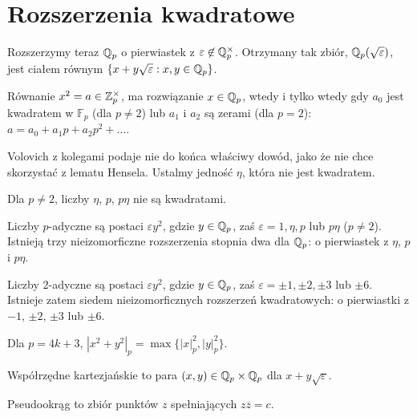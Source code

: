 \section{Rozszerzenia kwadratowe}
Rozszerzymy teraz $\mathbb Q_p$ o pierwiastek z $\varepsilon \not \in \mathbb Q_p^\times$. Otrzymany tak zbiór, $\mathbb Q_p(\sqrt{\varepsilon})$, jest ciałem równym $\{x + y \sqrt{\varepsilon} : x, y \in \mathbb Q_p\}$.

\begin{lemat}
	Równanie $x^2 = a \in \mathbb Z_p^\times$, ma rozwiązanie $x \in \mathbb Q_p$, wtedy i tylko wtedy gdy $a_0$ jest kwadratem w $\mathbb F_p$ (dla $p \neq 2$) lub $a_ 1$ i $a_2$ są zerami (dla $p = 2$): $a = a_0 + a_1p + a_2p^2 + \ldots$.
\end{lemat}

Volovich z kolegami podaje nie do końca właściwy dowód, jako że nie chce skorzystać z lematu Hensela.
Ustalmy  jedność $\eta$, która nie jest kwadratem.

\begin{wniosek}
	Dla $p \neq 2$, liczby $\eta$, $p$, $p \eta$ nie są kwadratami.
\end{wniosek}

\begin{wniosek}
	Liczby $p$-adyczne są postaci $\varepsilon y^2$, gdzie $y \in \mathbb Q_p$, zaś $\varepsilon = 1, \eta, p$ lub $p\eta$ ($p \neq 2$).
	Istnieją trzy nieizomorficzne rozszerzenia stopnia dwa dla $\mathbb Q_p$: o pierwiastek z $\eta$, $p$ i $p \eta$.
\end{wniosek}

\begin{wniosek}
	Liczby $2$-adyczne są postaci $\varepsilon y^2$, gdzie $y \in \mathbb Q_p$, zaś $\varepsilon = \pm 1, \pm 2, \pm 3$ lub $\pm 6$.
	Istnieje zatem siedem nieizomorficznych rozszerzeń kwadratowych: o pierwiastki z $-1$, $\pm 2$, $\pm 3$ lub $\pm 6$.
\end{wniosek}

\begin{wniosek}
	Dla $p = 4k + 3$, $|x^2 + y^2|_p = \max \{|x|^2_p, |y|_p^2\}$.
\end{wniosek}

\begin{definicja}
	Współrzędne kartezjańskie to para $(x, y) \in \mathbb Q_p \times \mathbb Q_p$ dla $x + y \sqrt{\varepsilon}$.
\end{definicja}

\begin{definicja}
	Pseudookrąg to zbiór punktów $z$ spełniających $z \overline z = c$.
\end{definicja}

